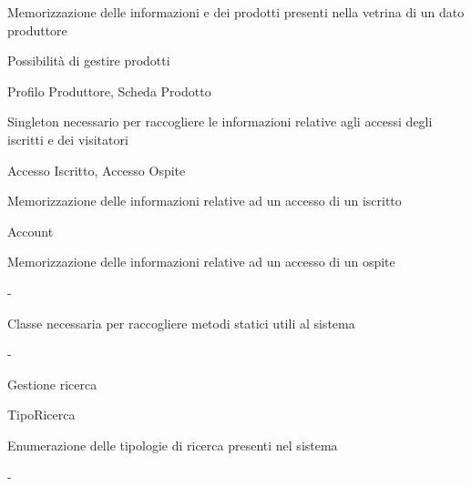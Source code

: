 
{\begin{itemWork}
    \item Memorizzazione delle informazioni e dei prodotti presenti nella vetrina di un dato produttore
	\item Possibilità di gestire prodotti
\end{itemWork}}
{Profilo Produttore, Scheda Prodotto}


{\begin{itemWork}
	\item Singleton necessario per raccogliere le informazioni relative agli accessi degli iscritti e dei visitatori
\end{itemWork}}
{Accesso Iscritto, Accesso Ospite}



{\begin{itemWork}
	\item Memorizzazione delle informazioni relative ad un accesso di un iscritto
\end{itemWork}}
{Account}



{\begin{itemWork}
	\item Memorizzazione delle informazioni relative ad un accesso di un ospite
\end{itemWork}}
{-}


{\begin{itemWork}
	\item Classe necessaria per raccogliere metodi statici utili al sistema
\end{itemWork}}
{-}


{\begin{itemWork}
	\item Gestione ricerca
\end{itemWork}}
{TipoRicerca}


{\begin{itemWork}
	\item Enumerazione delle tipologie di ricerca presenti nel sistema
\end{itemWork}}
{-}

